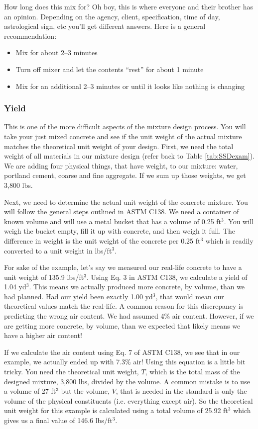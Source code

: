 \documentclass[12pt]{article}
\begin{document}
How long does this mix for? Oh boy, this is where everyone and their brother has an opinion. Depending on the agency, client, specification, time of day, astrological sign, etc you'll get different answers. Here is a general recommendation:
\begin{itemize}
    \item Mix for about 2--3 minutes
    \item Turn off mixer and let the contents ``rest'' for about 1 minute
    \item Mix for an additional 2--3 minutes or until it looks like nothing is changing
\end{itemize}

\subsubsection{Yield}
This is one of the more difficult aspects of the mixture design process. You will take your just mixed concrete and see if the unit weight of the actual mixture matches the theoretical unit weight of your design. First, we need the total weight of all materials in our mixture design (refer back to Table \ref{tab:SSDexam}). We are adding four physical things, that have weight, to our mixture: water, portland cement, coarse and fine aggregate. If we sum up those weights, we get 3,800 lbs.

Next, we need to determine the actual unit weight of the concrete mixture. You will follow the general steps outlined in ASTM C138. We need a container of known volume and will use a metal bucket that has a volume of 0.25 ft$^3$. You will weigh the bucket empty, fill it up with concrete, and then weigh it full. The difference in weight is the unit weight of the concrete per 0.25 ft$^3$ which is readily converted to a unit weight in lbs/ft$^3$.

For sake of the example, let's say we measured our real-life concrete to have a unit weight of 135.9 lbs/ft$^3$. Using Eq. 3 in ASTM C138, we calculate a yield of 1.04 yd$^3$. This means we actually produced more concrete, by volume, than we had planned. Had our yield been exactly 1.00 yd$^3$, that would mean our theoretical values match the real-life. A common reason for this discrepancy is predicting the wrong air content. We had assumed 4\% air content. However, if we are getting more concrete, by volume, than we expected that likely means we have a higher air content!

If we calculate the air content using Eq. 7 of ASTM C138, we see that in our example, we actually ended up with 7.3\% air! Using this equation is a little bit tricky. You need the theoretical unit weight, $T$, which is the total mass of the designed mixture, 3,800 lbs, divided by the volume. A common mistake is to use a volume of 27 ft$^3$ but the volume, $V$, that is needed in the standard is only the volume of the physical constituents (i.e. everything except air). So the theoretical unit weight for this example is calculated using a total volume of 25.92 ft$^3$ which gives us a final value of 146.6 lbs/ft$^3$.
\end{document}
